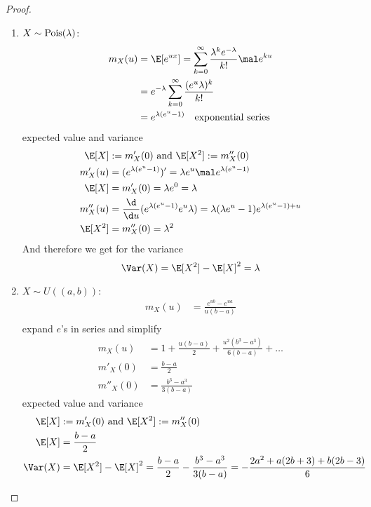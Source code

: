 \subsection{}
\begin{proof}
	\begin{enumerate}
		\item $X \sim \operatorname{Pois}(\lambda)$:
		\begin{align*}
			m_X(u) &= \E[e^{ux}] = \sum_{k=0}^{\infty}\frac{\lambda^k e^{-\lambda}}{k!}\mal e^{ku}\\
			&= e^{-\lambda}\sum_{k=0}^{\infty} \frac{(e^u\lambda)^k}{k!}\\
			&= e^{\lambda(e^u - 1)} \quad \text{exponential series}
		\end{align*}
		expected value and variance
		\begin{align*}
			\E[X] &:= m'_X(0) \and \E[X^2] := m''_X(0)\\
			m'_X(u) &= (e^{\lambda(e^u -1)})' = \lambda e^u \mal e^{\lambda(e^u -1)}\\
			\E[X] &= m'_X(0) = \lambda e^0 = \lambda\\
			m''_X(u) &= \frac{\d}{\d u}(e^{\lambda(e^u -1)}e^u \lambda) = \lambda(\lambda e^u - 1)e^{\lambda(e^u -1)+u}\\
			\E[X^2] &= m''_X(0) = \lambda^2
		\end{align*}
		And therefore we get for the variance
		\[
			\Var(X) = \E[X^2]-\E[X]^2 = \lambda
		\]
		\item $X \sim U((a,b))$:
		\begin{align*}
			m_X(u) &= \frac{e^{ub} - e^{ua}}{u(b-a)}\\
		\end{align*}
		expand $e$'s in series and simplify
		\begin{align*}
			m_X(u) &= 1 + \frac{u(b-a)}{2} + \frac{u^2(b^3 - a^3)}{6(b-a)} + \dots\\
			m'_X(0) &= \frac{b-a}{2}\\
			m''_X(0) &= \frac{b^3 - a^3}{3(b-a)}
		\end{align*}
		expected value and variance
		\begin{align*}
			\E[X] &:= m'_X(0) \and \E[X^2] := m''_X(0)\\
			\E[X] &= \frac{b-a}{2}\\
			\Var(X) &= \E[X^2] -\E[X]^2 = \frac{b-a}{2} - \frac{b^3 - a^3}{3(b-a)} = -\frac{2a^2 + a(2b+3)+b(2b-3)}{6}
		\end{align*}
	\end{enumerate}
\end{proof}
